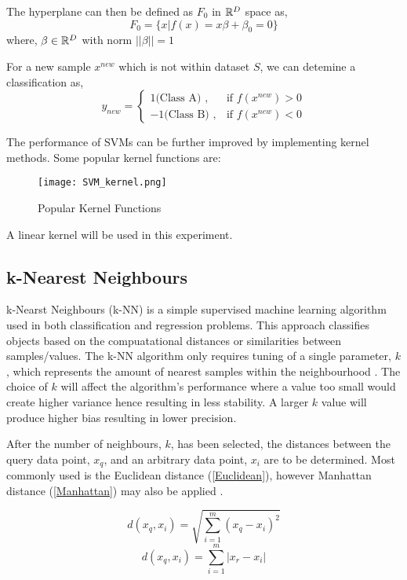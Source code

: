 The hyperplane can then be defined as $F_0$ in $\mathbb{R}^D$ space as,
\begin{equation}
    F_0 = \big \{x|f(x) = x \beta + \beta_0 = 0 \big \} 
\end{equation}  
where, 
$\beta \in \mathbb{R}^D$ with norm $||\beta|| = 1$

For a new sample $x^{new}$ which is not within dataset $S$, we can detemine a classification as,
\begin{equation}
    y_{new} = \begin{cases}
        1 \text{(Class A) }, & \text{if } f(x^{new}) > 0 \\
        -1 \text{(Class B) }, & \text{if } f(x^{new}) < 0
    \end{cases}
\end{equation}

The performance of SVMs can be further improved by implementing kernel methods. Some popular kernel functions are:
\begin{figure}[h]
    \texttt{[image: SVM\_kernel.png]}
    \centering
    \caption{Popular Kernel Functions \cite{6653952}}
    \label{fig:kernel}
\end{figure}

A linear kernel will be used in this experiment.

\subsection{k-Nearest Neighbours}
k-Nearst Neighbours (k-NN) is a simple supervised machine learning algorithm used in both classification and regression problems. 
This approach classifies objects based on the compuatational distances or similarities between samples/values.
The k-NN algorithm only requires tuning of a single parameter, $k$, which represents the amount of nearest samples within the neighbourhood \cite{d163fd27cc414d1a806b3e2db0164bfc}.
The choice of $k$ will affect the algorithm's performance where a value too small would create higher variance hence resulting in less stability.
A larger $k$ value will produce higher bias resulting in lower precision. 

After the number of neighbours, $k$, has been selected, the distances between the query data point, $x_q$, and an arbitrary data point, $x_i$ are to be determined.
Most commonly used is the Euclidean distance (\ref{Euclidean}), however Manhattan distance (\ref{Manhattan}) may also be applied \cite{knn}.

\begin{equation} \label{Euclidean}
    d(x_q,x_i) = \sqrt{\sum_{i=1}^{m} (x_q - x_i)^2}
\end{equation}
\begin{equation} \label{Manhattan}
    d(x_q,x_i) = \sum_{i=1}^{m} \lvert x_r - x_i \rvert
\end{equation}

